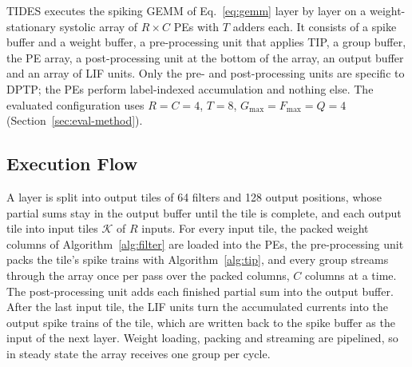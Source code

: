TIDES executes the spiking GEMM of Eq.~\eqref{eq:gemm} layer by layer on a weight-stationary systolic array of
$R \times C$ PEs with $T$ adders each. It consists of a spike buffer and a weight buffer, a pre-processing unit
that applies TIP, a group buffer, the PE array, a post-processing unit at the bottom of the array, an output
buffer and an array of LIF units. Only the pre- and post-processing units are specific to DPTP; the PEs perform
label-indexed accumulation and nothing else. The evaluated configuration uses $R = C = 4$, $T = 8$,
$G_{\max} = F_{\max} = Q = 4$ (Section~\ref{sec:eval-method}).

\subsection{Execution Flow}
\label{sec:arch-flow}
A layer is split into output tiles of 64 filters and 128 output positions, whose partial sums stay in the output
buffer until the tile is complete, and each output tile into input tiles $\mathcal{K}$ of $R$ inputs. For every
input tile, the packed weight columns of Algorithm~\ref{alg:filter} are loaded into the PEs, the pre-processing
unit packs the tile's spike trains with Algorithm~\ref{alg:tip}, and every group streams through the array once
per pass over the packed columns, $C$ columns at a time. The post-processing unit adds each finished partial sum
into the output buffer. After the last input tile, the LIF units turn the accumulated currents into the output
spike trains of the tile, which are written back to the spike buffer as the input of the next layer. Weight
loading, packing and streaming are pipelined, so in steady state the array receives one group per cycle.

